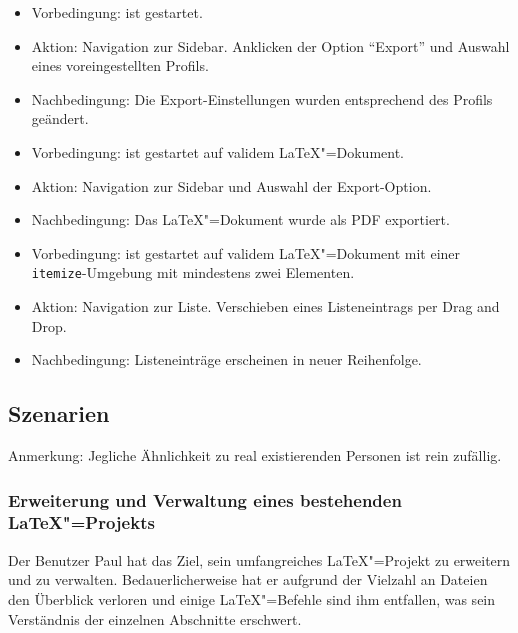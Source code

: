 \begin{itemize}
  \item Vorbedingung: \texla{} ist gestartet.
  \item Aktion: Navigation zur Sidebar.
  Anklicken der Option \enquote{Export} und Auswahl eines voreingestellten Profils.
  \item Nachbedingung: Die Export-Einstellungen wurden entsprechend des Profils geändert.
\end{itemize}

\begin{itemize}
  \item Vorbedingung: \texla{} ist gestartet auf validem \LaTeX"=Dokument.
  \item Aktion: Navigation zur Sidebar und Auswahl der Export-Option.
  \item Nachbedingung: Das \LaTeX"=Dokument wurde als PDF exportiert.
\end{itemize}

\begin{itemize}
  \item Vorbedingung: \texla{} ist gestartet auf validem \LaTeX"=Dokument mit einer \verb|itemize|-Umgebung mit
  mindestens zwei Elementen.
  \item Aktion: Navigation zur Liste.
  Verschieben eines Listeneintrags per Drag and Drop.
  \item Nachbedingung: Listeneinträge erscheinen in neuer Reihenfolge.
\end{itemize}

\subsection{Szenarien}
\label{subsec:tests-scenarios}

Anmerkung: Jegliche Ähnlichkeit zu real existierenden Personen ist rein zufällig.

\subsubsection{Erweiterung und Verwaltung eines bestehenden \LaTeX"=Projekts}

Der Benutzer Paul hat das Ziel, sein umfangreiches \LaTeX"=Projekt zu erweitern und zu verwalten.
Bedauerlicherweise hat er aufgrund der Vielzahl an Dateien den Überblick verloren und einige \LaTeX"=Befehle sind
ihm entfallen, was sein Verständnis der einzelnen Abschnitte erschwert.

